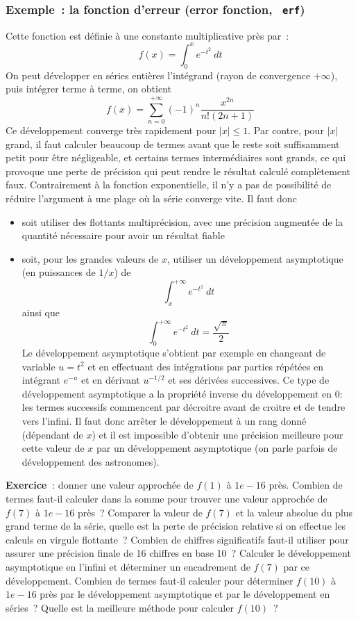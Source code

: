 \documentclass[a4paper,11pt]{article}
\begin{document}
\begin{giacjshere}
\subsubsection{Exemple~: la fonction d'erreur (error fonction, {\tt
    erf})}
Cette fonction est définie à une constante multiplicative près par~:
\[ f(x)=\int_0^x e^{-t^2} \ dt \]
On peut développer en séries entières l'intégrand (rayon
de convergence $+\infty$), puis intégrer terme
à terme, on obtient
\[ f(x)= \sum_{n=0}^{+\infty} (-1)^n \frac{x^{2n}}{n! (2n+1)}\]
Ce développement converge très rapidement pour $|x|\leq 1$.
Par contre, pour $|x|$ grand, il faut calculer beaucoup de termes
avant que le reste soit suffisamment petit pour être négligeable,
et certains termes intermédiaires sont grands, ce qui provoque
une perte de précision qui peut rendre le résultat calculé
complètement faux. Contrairement à la fonction exponentielle,
il n'y a pas de possibilité de réduire l'argument à une plage
où la série converge vite. Il faut donc
\begin{itemize}
\item soit utiliser des flottants multiprécision, avec une précision
augmentée de la quantité nécessaire pour avoir un résultat fiable
\item soit, pour les grandes valeurs de $x$, utiliser un développement
asymptotique (en puissances de $1/x$) de
\[ \int_x^{+\infty} e^{-t^2} \ dt \]
ainsi que 
\[ \int_0^{+\infty} e^{-t^2} \ dt =\frac{\sqrt{\pi }}{2} \]
Le développement asymptotique
s'obtient par exemple en changeant de variable
$u=t^2$ et en effectuant des intégrations par parties répétées
en intégrant $e^{-u}$ et en dérivant $u^{-1/2}$ et ses dérivées
successives. Ce type de développement asymptotique a la propriété
inverse du développement en 0: les termes successifs commencent
par décroitre avant de croitre et de tendre vers l'infini. Il faut
donc arrêter le développement à un rang donné (dépendant de $x$)
et il est impossible d'obtenir une précision meilleure pour cette
valeur de $x$ par un développement asymptotique (on parle parfois de
développement des astronomes).
\end{itemize}

{\bf Exercice~}: donner une valeur approchée de $f(1)$ à $1e-16$ près.
Combien de termes faut-il calculer dans la somme pour trouver
une valeur approchée de $f(7)$ à $1e-16$ près~? Comparer la valeur
de $f(7)$ et la valeur absolue du plus grand terme de la série,
quelle est la perte de précision relative si on effectue les
calculs en virgule flottante~? Combien de chiffres significatifs
faut-il utiliser pour assurer une précision finale de 16 chiffres
en base 10~? Calculer le développement asymptotique en l'infini
et déterminer un encadrement de $f(7)$ par ce développement. Combien
de termes faut-il calculer pour déterminer $f(10)$ à $1e-16$ près
par le développement asymptotique et par le développement en séries~?
Quelle est la meilleure méthode pour calculer $f(10)$~?


\end{giacjshere}
\end{document}
